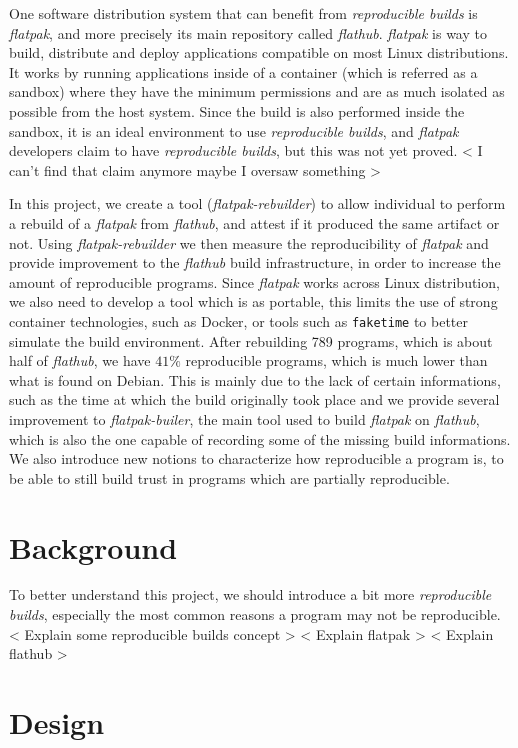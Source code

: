 \documentclass[a4paper,11pt,oneside]{report}
\theoremstyle{definition}
\newcommand{\sysname}{\emph{flatpak-rebuilder}\xspace}
\newcommand{\rb}{\emph{reproducible builds}\xspace}
\newcommand{\fp}{\emph{flatpak}\xspace}
\newcommand{\fh}{\emph{flathub}\xspace}
\newcommand{\fb}{\emph{flatpak-builer}\xspace}
\begin{document}
One software distribution system that can benefit from \rb is \fp, and more
precisely its main repository called \fh. \fp is way to build, distribute and
deploy applications compatible on most Linux distributions. It works by running
applications inside of a container (which is referred as a sandbox) where they
have the minimum permissions and are as much isolated as possible from the host
system. Since the build is also performed inside the sandbox, it is an ideal
environment to use \rb, and \fp developers claim to have \rb, but this was not
yet proved.
< I can't find that claim anymore maybe I oversaw something >

In this project, we create a tool (\sysname) to allow individual to perform a
rebuild of a \fp from \fh, and attest if it produced the same artifact or not.
Using \sysname we then measure the reproducibility of \fp and provide
improvement to the \fh build infrastructure, in order to increase the amount of
reproducible programs. Since \fp works across Linux distribution, we also need
to develop a tool which is as portable, this limits the use of strong container
technologies, such as Docker, or tools such as \verb|faketime| to better
simulate the build environment.
After rebuilding 789 programs, which is about half of \fh, we have $41\%$
reproducible programs, which is much lower than what is found on Debian. This
is mainly due to the lack of certain informations, such as the time at which
the build originally took place and we provide several improvement to \fb, the
main tool used to build \fp on \fh, which is also the one capable of recording
some of the missing build informations.
We also introduce new notions to characterize how reproducible a program is, to
be able to still build trust in programs which are partially reproducible.

\chapter{Background}
\label{chap:bg}

To better understand this project, we should introduce a bit more \rb,
especially the most common reasons a program may not be reproducible.
< Explain some reproducible builds concept >
< Explain flatpak >
< Explain flathub >

\chapter{Design}
\end{document}
